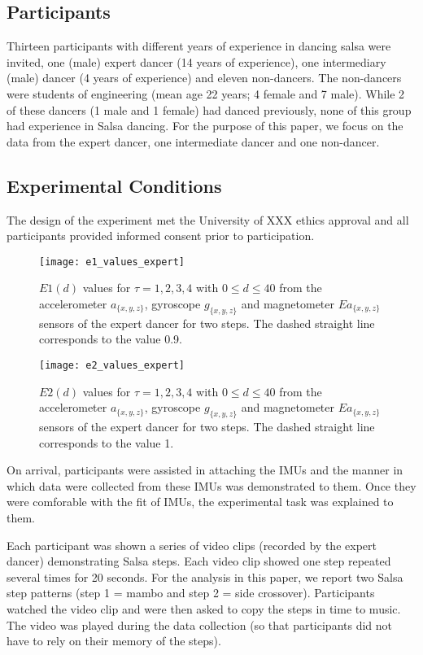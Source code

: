 \documentclass{sigchi}
\begin{document}
\subsection{Participants}
Thirteen participants with different years of experience in dancing salsa were invited, one (male) 
expert dancer (14 years of experience), one intermediary (male) dancer (4 years of experience) 
and eleven non-dancers. 
The non-dancers were students of engineering (mean age 22 years; 4 female and 7 male).  
While 2 of these dancers (1 male and 1 female) had danced previously, none of this group had experience 
in Salsa dancing.  
For the purpose of this paper, we focus on the data from the expert dancer, one intermediate dancer and one non-dancer.

\subsection{Experimental Conditions}
The design of the experiment met the University of XXX ethics approval and all participants provided informed 
consent prior to participation.

  
  \begin{figure*}[!t]
  \centering    
  \texttt{[image: e1\_values\_expert]}
  \caption[PA]{$E1(d)$ values for $\tau=1,2,3,4$ with $0 \leq d \leq 40$
  from the accelerometer $a_{ \{ x,y,z \} }$, gyroscope $g_{ \{ x,y,z \} }$ and magnetometer $Ea_{ \{ x,y,z \} }$ sensors of the expert dancer for two steps.
  The dashed straight line corresponds to the value 0.9.}
  \label{fig:e1_vals}
  \end{figure*}
  
  \begin{figure*}[!t]
  \centering    
  \texttt{[image: e2\_values\_expert]}
  \caption[PA]{$E2(d)$ values for $\tau=1,2,3,4$ with $0 \leq d \leq 40$
  from the accelerometer $a_{ \{ x,y,z \} }$, gyroscope $g_{ \{ x,y,z \} }$ and magnetometer $Ea_{ \{ x,y,z \} }$ sensors of the expert dancer for two steps.
  The dashed straight line corresponds to the value 1.}
  \label{fig:e2_vals}
  \end{figure*}
  
On arrival, participants were assisted in attaching the IMUs and the manner in which data were collected 
from these IMUs was demonstrated to them.  Once they were comforable with the fit of IMUs, 
the experimental task was explained to them.  

Each participant was shown a series of video clips (recorded by the expert dancer) demonstrating Salsa steps.  
Each video clip showed one step repeated several times for 20 seconds.  For the analysis in this paper, 
we report two Salsa step patterns (step 1 = mambo and step 2 = side crossover).  
Participants watched the video clip and were then asked to copy the steps in time to music.  
The video was played during the data collection 
(so that participants did not have to rely on their memory of the steps).
\end{document}
